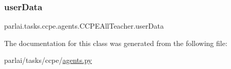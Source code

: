 \subsubsection{\texorpdfstring{user\+Data}{userData}}
{\footnotesize\ttfamily parlai.\+tasks.\+ccpe.\+agents.\+C\+C\+P\+E\+All\+Teacher.\+user\+Data}



The documentation for this class was generated from the following file\+:\begin{DoxyCompactItemize}
\item 
parlai/tasks/ccpe/\hyperlink{parlai_2tasks_2ccpe_2agents_8py}{agents.\+py}\end{DoxyCompactItemize}
